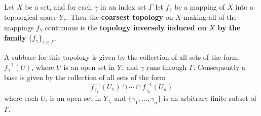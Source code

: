 Let $X$ be a set, and for each $\gamma$ in an index set $\Gamma$ let $f_{\gamma}$ be a mapping of $X$ into a topological space $Y_{\gamma}$. Then the \textbf{coarsest topology} on $X$ making all of the mappings $f_{\gamma}$ continuous is the \textbf{topology inversely induced on $X$ by the family} $\{f_{\gamma}\}_{\gamma \in \Gamma}$.

A subbase for this topology is given by the collection of all sets of the form $f_{\gamma}^{-1}(U)$, where $U$ is an open set in $Y_{\gamma}$ and $\gamma$ runs through $\Gamma$. Consequently a base is given by the collection of all sets of the form
$$f_{\gamma_{1}}^{-1}(U_{1}) \cap \cdots \cap f_{\gamma_{n}}^{-1}(U_{n})$$
where each $U_{i}$ is an open set in $Y_{\gamma_{i}}$ and $\{\gamma_{1}, \ldots, \gamma_{n}\}$ is an arbitrary finite subset of $\Gamma$.
